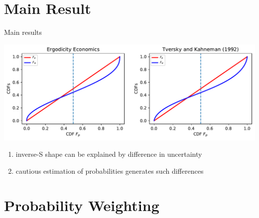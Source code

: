 \section{Main Result}

\begin{frame}{Main results}
\begin{center}
	\includegraphics[width=.9\textwidth]{../../figs/Our_result_LocScale_vs_KT.pdf}
\end{center}

\begin{enumerate}
	\item	inverse-S shape can be explained by difference in uncertainty
	\item cautious estimation of probabilities generates such differences
\end{enumerate}
\label{MainResults}
\hyperlink{weight_vs_estimate}{}
\end{frame}

\section{Probability Weighting}

